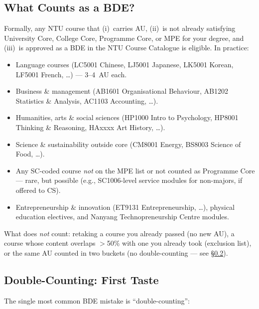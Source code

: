 \subsection{What Counts as a BDE?}
Formally, any NTU course that (i)~carries AU, (ii)~is not already satisfying University Core, College Core, Programme Core, or MPE for your degree, and (iii)~is approved as a BDE in the NTU Course Catalogue is eligible. In practice:

\begin{itemize}
    \item Language courses (LC5001 Chinese, LJ5001 Japanese, LK5001 Korean, LF5001 French, \dots) --- 3--4~AU each.
    \item Business \& management (AB1601 Organisational Behaviour, AB1202 Statistics \& Analysis, AC1103 Accounting, \dots).
    \item Humanities, arts \& social sciences (HP1000 Intro to Psychology, HP8001 Thinking \& Reasoning, HAxxxx Art History, \dots).
    \item Science \& sustainability outside core (CM8001 Energy, BS8003 Science of Food, \dots).
    \item Any SC-coded course \emph{not} on the MPE list or not counted as Programme Core --- rare, but possible (e.g., SC1006-level service modules for non-majors, if offered to CS).
    \item Entrepreneurship \& innovation (ET9131 Entrepreneurship, \dots), physical education electives, and Nanyang Technopreneurship Centre modules.
\end{itemize}

What does \emph{not} count: retaking a course you already passed (no new AU), a course whose content overlaps $>$50\% with one you already took (exclusion list), or the same AU counted in two buckets (no double-counting --- see \S\ref{sec:double-count-intro}).

\subsection{Double-Counting: First Taste}
\label{sec:double-count-intro}
The single most common BDE mistake is ``double-counting'':

